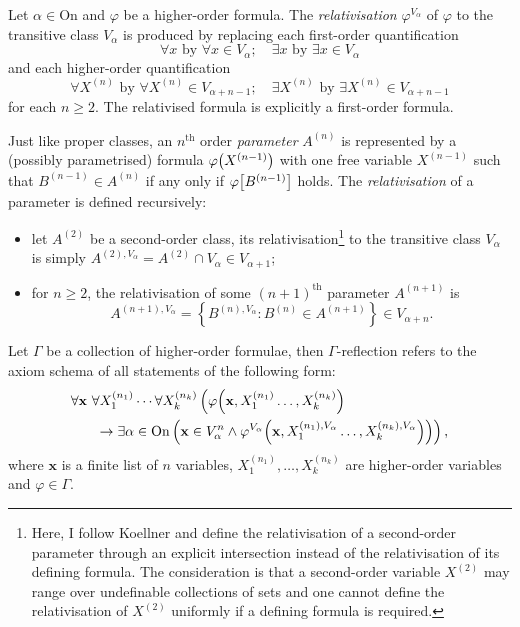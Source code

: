\documentclass[12pt]{article}
\theoremstyle{plain}
\theoremstyle{definition}
\newcommand{\On}{\mathrm{On}}
\begin{document}
\begin{definition}[Relativisation]
	Let $\alpha \in \On$ and $\varphi$ be a higher-order formula. The \emph{relativisation} $\varphi^{V_\alpha}$ of $\varphi$ to the transitive class $V_\alpha$ is produced by replacing each first-order quantification
	\[\text{$\forall x$ by $\forall x \in V_\alpha$}; \quad \text{$\exists x$ by $\exists x \in V_\alpha$}\]
	and each higher-order quantification
	\[\text{$\forall X^{(n)}$ by $\forall X^{(n)} \in V_{\alpha + n - 1}$}; \quad \text{$\exists X^{(n)}$ by $\exists X^{(n)} \in V_{\alpha + n - 1}$}\]
	for each $n \geq 2$. The relativised formula is explicitly a first-order formula.

	Just like proper classes, an $n^\text{th}$ order \emph{parameter} $A^{(n)}$ is represented by a (possibly parametrised) formula $\varphi\mleft(X^{(n - 1)}\mright)$ with one free variable $X^{(n - 1)}$ such that $B^{(n - 1)} \in A^{(n)}$ if any only if $\varphi\mleft[B^{(n - 1)}\mright]$ holds. The \emph{relativisation} of a parameter is defined recursively:
	\begin{itemize}
		\item let $A^{(2)}$ be a second-order class, its relativisation\footnote{Here, I follow Koellner \cite{reflection-principles} and define the relativisation of a second-order parameter through an explicit intersection instead of the relativisation of its defining formula. The consideration is that a second-order variable $X^{(2)}$ may range over undefinable collections of sets and one cannot define the relativisation of $X^{(2)}$ uniformly if a defining formula is required.} to the transitive class $V_\alpha$ is simply $A^{(2), V_\alpha} = A^{(2)} \cap V_\alpha \in V_{\alpha + 1}$;
		\item for $n \geq 2$, the relativisation of some $\left(n + 1\right)^\text{th}$ parameter $A^{(n + 1)}$ is
		      \[A^{(n + 1), V_\alpha} = \left\{B^{(n), V_\alpha} : B^{(n)} \in A^{(n + 1)}\right\} \in V_{\alpha + n}.\]
	\end{itemize}
\end{definition}

\begin{definition}
	Let $\Gamma$ be a collection of higher-order formulae, then $\Gamma$-reflection refers to the axiom schema of all statements of the following form:
	\begin{align*}
		\forall \mathbf{x} \  & \forall X_1^{(n_1)} \cdots \forall X_k^{(n_k)} \left(\varphi\mleft(\mathbf{x}, X_1^{(n_1)} \ldots, X_k^{(n_k)}\mright)\right.                                                                     \\
		                      & \left.{} \rightarrow \exists \alpha \in \On \left(\mathbf{x} \in V_\alpha^n \land \varphi^{V_\alpha}\mleft(\mathbf{x}, X_1^{(n_1), V_\alpha} \ldots, X_k^{(n_k), V_\alpha}\mright)\right)\right),
	\end{align*}
	where $\mathbf{x}$ is a finite list of $n$ variables, $X_1^{(n_1)}, \ldots, X_k^{(n_k)}$ are higher-order variables and $\varphi \in \Gamma$.
\end{definition}
\end{document}
